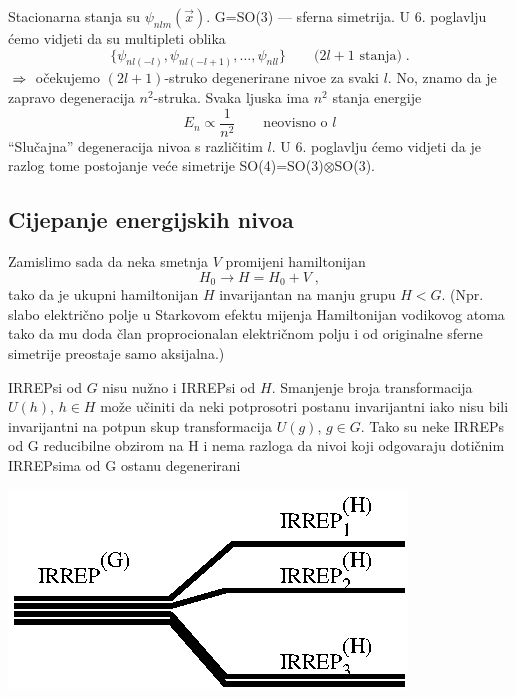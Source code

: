 \begin{primjer}

Stacionarna stanja su $\psi_{nlm}(\vec{x})$. G=SO(3) --- sferna simetrija.
U 6. poglavlju ćemo vidjeti da su multipleti oblika
\begin{displaymath}
   \{ \psi_{nl(-l)}, \psi_{nl(-l+1)}, \ldots, \psi_{nll}\} \qquad 
\text{($2l+1$ stanja)} \;.
\end{displaymath}
$\;\Rightarrow\;$ očekujemo $(2l+1)$-struko degenerirane nivoe za svaki $l$. No,
znamo da je zapravo degeneracija $n^2$-struka. Svaka ljuska ima $n^2$
stanja energije
\begin{displaymath}
  E_n \propto \frac{1}{n^2} \qquad \text{neovisno o $l$}
\end{displaymath}
``Slučajna'' degeneracija nivoa s različitim $l$. U 6. poglavlju
ćemo vidjeti da je razlog tome 
postojanje veće simetrije SO(4)=SO(3)$\otimes$SO(3).
\end{primjer}

\subsection*{Cijepanje energijskih nivoa}

Zamislimo sada da neka smetnja $V$  promijeni hamiltonijan
\begin{displaymath}
    H_0 \to H = H_0 + V \;,
\end{displaymath}
tako da je ukupni hamiltonijan $H$ invarijantan na manju grupu $H<G$.
(Npr. slabo električno polje u Starkovom efektu mijenja Hamiltonijan
vodikovog atoma tako da mu doda član proprocionalan električnom polju
i od originalne sferne simetrije preostaje samo aksijalna.)

IRREPsi od $G$ nisu nužno i IRREPsi od $H$. Smanjenje broja transformacija
$U(h)$, $h\in H$ može učiniti da neki potprosotri postanu invarijantni
iako nisu bili invarijantni na potpun skup transformacija $U(g)$, $g\in G$.
Tako su neke IRREPs od G reducibilne obzirom na H i nema razloga da 
nivoi koji odgovaraju dotičnim IRREPsima od G ostanu
degenerirani

\centerline{\includegraphics[scale=1.0]{pics/splitting.eps}}
 
